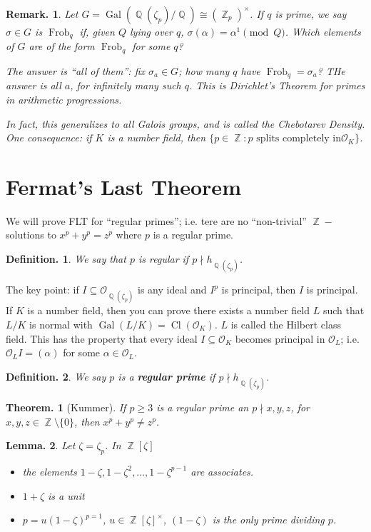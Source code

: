 \documentclass[11pt, a4paper]{memoir}
\DeclareMathOperator{\Q}{{\mathbb{Q}}}
\DeclareMathOperator{\Z}{{\mathbb{Z}}}
\theoremstyle{change}
\newtheorem{theorem}{Theorem.}[section]
\newtheorem{lemma}[theorem]{Lemma.}
\theoremstyle{plain}
\theoremstyle{nonumberplain}
\newtheorem{definition}{Definition.}
\newtheorem{remark}{Remark.}
\DeclareMathOperator{\Gal}{Gal}
\DeclareMathOperator{\Frob}{Frob}
\DeclareMathOperator{\Cl}{Cl}
\newcommand{\mbf}[1]{{\boldmath\bfseries #1}}
\numberwithin{equation}{section}
\begin{document}
\begin{remark}
    Let $G=\Gal(\Q(\zeta_p)/\Q)\cong(\Z_p)^\times$.
    If $q$ is prime, we say $\sigma\in G$ is $\Frob_q$ if, given $Q$ lying over $q$, $\sigma(\alpha)=\alpha^1\pmod{Q}$.
    Which elements of $G$ are of the form $\Frob_q$ for some $q$?

    The answer is ``all of them'': fix $\sigma_a\in G$; how many $q$ have $\Frob_q=\sigma_a$?
    THe answer is all $a$, for infinitely many such $q$.
    This is Dirichlet's Theorem for primes in arithmetic progressions.

    In fact, this generalizes to all Galois groups, and is called the Chebotarev Density.
    One consequence: if $K$ is a number field, then $\{p\in\Z:p\text{ splits completely in}\mathcal{O}_K\}$.
\end{remark}
\section{Fermat's Last Theorem}
We will prove FLT for ``regular primes''; i.e. tere are no ``non-trivial'' $\Z-$solutions to $x^p+y^p=z^p$ where $p$ is a regular prime.
\begin{definition}
    We say that $p$ is regular if $p\nmid h_{\Q(\zeta_p)}$.
\end{definition}
The key point: if $I\subseteq\mathcal{O}_{\Q(\zeta_p)}$ is any ideal and $I^p$ is principal, then $I$ is principal.
If $K$ is a number field, then you can prove there exists a number field $L$ such that $L/K$ is normal with $\Gal(L/K)=\Cl(\mathcal{O}_K)$.
$L$ is called the Hilbert class field.
This has the property that every ideal $I\subseteq\mathcal{O}_K$ becomes principal in $\mathcal{O}_L$; i.e. $\mathcal{O}_LI=(\alpha)$ for some $\alpha\in\mathcal{O}_L$.
\begin{definition}
    We say $p$ is a \mbf{regular prime} if $p\nmid h_{\Q(\zeta_p)}$.
\end{definition}
\begin{theorem}[Kummer]
    If $p\geq 3$ is a regular prime an $p\nmid x,y,z$, for $x,y,z\in\Z\setminus\{0\}$, then $x^p+y^p\neq z^p$.
\end{theorem}
\begin{lemma}
    Let $\zeta=\zeta_p$.
    In $\Z[\zeta]$
    \begin{itemize}[nl]
        \item the elements $1-\zeta,1-\zeta^2,\ldots,1-\zeta^{p-1}$ are associates.
        \item $1+\zeta$ is a unit
        \item $p=u(1-\zeta)^{p=1}$, $u\in\Z[\zeta]^\times$, $(1-\zeta)$ is the only prime dividing $p$.
    \end{itemize}
\end{lemma}
\end{document}
